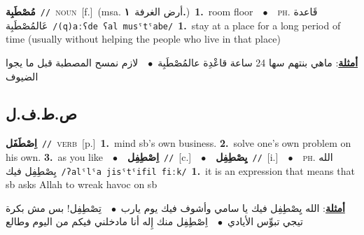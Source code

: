 \documentclass[10pt,a4paper,twoside]{article} %
\begin{document}
\begin{multicols}{2}
{\setlength\topsep{0pt}\textbf{\foreignlanguage{arabic}{مُصْطَبِة}}\ {\color{gray}\texttt{//}\color{black}}\ \textsc{noun}\ [f.]\ \color{gray}(msa. \foreignlanguage{arabic}{أرض الغرفة}~\foreignlanguage{arabic}{\textbf{١.}})\color{black}\ \textbf{1.}~room floor\ \ $\bullet$\ \ \textsc{ph.} \color{gray} \foreignlanguage{arabic}{قَاعدة عَالمُصْطَبِة}\color{black}\ {\color{gray}\texttt{/{\sffamily (q)aːʕde ʕal musˤtˤabe}/}\color{black}}\ \textbf{1.}~stay at a place for a long period of time (usually without helping the people who live in that place)\  \begin{flushright}\color{gray}\foreignlanguage{arabic}{\textbf{\underline{\foreignlanguage{arabic}{أمثلة}}}: ماهي بنتهم سها 24 ساعة قاعْدِة عالمُصْطَبِة\ $\bullet$\ \  لازم نمسح المصطبة قبل ما يجوا الضيوف}\end{flushright}\color{black}} \vspace{2mm}

\vspace{-3mm}
\subsection*{\color{blue}\foreignlanguage{arabic}{ص.ط.ف.ل}\color{blue}{}} 

{\setlength\topsep{0pt}\textbf{\foreignlanguage{arabic}{اِصْطَفَل}}\ {\color{gray}\texttt{//}\color{black}}\ \textsc{verb}\ [p.]\ \textbf{1.}~mind sb's own business.  \textbf{2.}~solve one's own problem on his own.  \textbf{3.}~as you like\ \ $\bullet$\ \ \setlength\topsep{0pt}\textbf{\foreignlanguage{arabic}{اِصْطِفِل}}\ {\color{gray}\texttt{//}\color{black}}\ [c.]\ \ $\bullet$\ \ \setlength\topsep{0pt}\textbf{\foreignlanguage{arabic}{يِصْطِفِل}}\ {\color{gray}\texttt{//}\color{black}}\ [i.]\ \ $\bullet$\ \ \textsc{ph.} \color{gray} \foreignlanguage{arabic}{الله يِصْطِفِل فيك}\color{black}\ {\color{gray}\texttt{/{\sffamily ʔalˤlˤa jisˤtˤifil fiːk}/}\color{black}}\ \textbf{1.}~it is an expression that means that sb asks Allah to wreak havoc on sb\  \begin{flushright}\color{gray}\foreignlanguage{arabic}{\textbf{\underline{\foreignlanguage{arabic}{أمثلة}}}: الله يِصْطِفِل فيك يا سامي وأشوف فيك يوم يارب\ $\bullet$\ \  تِصْطِفِل! بس مش بكرة تيجي تبوِّس الأيادي\ $\bullet$\ \  اِصْطِفِل منك إِله أنا مادخلني فيكم من اليوم وطالع}\end{flushright}\color{black}} \vspace{2mm}


\end{multicols}
\end{document}
